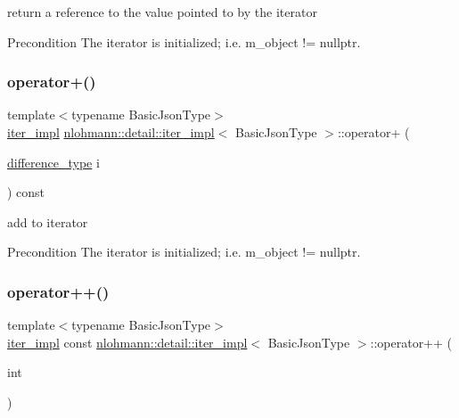 return a reference to the value pointed to by the iterator 

\begin{DoxyPrecond}{Precondition}
The iterator is initialized; i.\+e. {\ttfamily m\+\_\+object != nullptr}. 
\end{DoxyPrecond}
\mbox{\label{classnlohmann_1_1detail_1_1iter__impl_a8ef76aeb5a5032768f0f61f48ac189c0}} 
\subsubsection{\texorpdfstring{operator+()}{operator+()}}
{\footnotesize\ttfamily template$<$typename Basic\+Json\+Type$>$ \\
\mbox{\hyperlink{classnlohmann_1_1detail_1_1iter__impl}{iter\+\_\+impl}} \mbox{\hyperlink{classnlohmann_1_1detail_1_1iter__impl}{nlohmann\+::detail\+::iter\+\_\+impl}}$<$ Basic\+Json\+Type $>$\+::operator+ (\begin{DoxyParamCaption}\item[{\mbox{\hyperlink{classnlohmann_1_1detail_1_1iter__impl_a2f7ea9f7022850809c60fc3263775840}{difference\+\_\+type}}}]{i }\end{DoxyParamCaption}) const\hspace{0.3cm}{\ttfamily [inline]}}



add to iterator 

\begin{DoxyPrecond}{Precondition}
The iterator is initialized; i.\+e. {\ttfamily m\+\_\+object != nullptr}. 
\end{DoxyPrecond}
\mbox{\label{classnlohmann_1_1detail_1_1iter__impl_a7d2397773b2dce42f30f0375a6a1d850}} 
\subsubsection{\texorpdfstring{operator++()}{operator++()}\hspace{0.1cm}{\footnotesize\ttfamily [1/2]}}
{\footnotesize\ttfamily template$<$typename Basic\+Json\+Type$>$ \\
\mbox{\hyperlink{classnlohmann_1_1detail_1_1iter__impl}{iter\+\_\+impl}} const \mbox{\hyperlink{classnlohmann_1_1detail_1_1iter__impl}{nlohmann\+::detail\+::iter\+\_\+impl}}$<$ Basic\+Json\+Type $>$\+::operator++ (\begin{DoxyParamCaption}\item[{int}]{ }\end{DoxyParamCaption})\hspace{0.3cm}{\ttfamily [inline]}}



